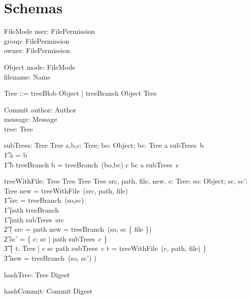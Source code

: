 \section{Schemas}

\begin{schema}{FileMode}
  user: FilePermission \\
  group: FilePermission \\
  owner: FilePermission
\end{schema}

\begin{schema}{Object}
  mode: FileMode \\
	filename: Name
\end{schema}

\begin{zed}
  Tree ::= treeBlob \ldata Object \rdata | treeBranch \ldata Object \cross \finset Tree \rdata
\end{zed}

\begin{schema}{Commit}
	author: Author \\
	message: Message \\
	tree: Tree
\end{schema}

\begin{axdef}
  subTrees: Tree \pfun \finset Tree
\where
  \exists a,b,c: Tree; bo: Object; bc: \finset Tree \spot a \in subTrees~b \iff \\
  \t1 a = b \lor \\
  \t1 b \in \ran treeBranch \land b = treeBranch~(bo,bc) \land c \in bc \land a \in subTrees~c
\end{axdef}

\begin{axdef}
  treeWithFile: Tree \cross Tree \cross Tree \pfun Tree
\where
  \exists src, path, file, new, c: Tree; so: Object; sc, sc': \finset Tree \spot new = treeWithFile~(src, path, file) \iff \\
  \t1 src = treeBranch~(so,sc) \land \\
  \t1 path \in \ran treeBranch \land \\
  \t1 path \in subTrees~src \land \\
    \t2 ( src = path \land new = treeBranch~(so, sc \cup \{ file \}) \lor \\
    \t2 sc' = \{ c: sc | path \notin subTrees~c \} \cup \\
      \t3 \{ t: Tree | c \in sc \land path \in subTrees~c \land t = treeWithFile~(c, path, file) \} \land \\
      \t3 new = treeBranch~(so, sc') )
\end{axdef}

\begin{axdef}
  hashTree: Tree \surj Digest
\end{axdef}

\begin{axdef}
  hashCommit: Commit \surj Digest
\end{axdef}

